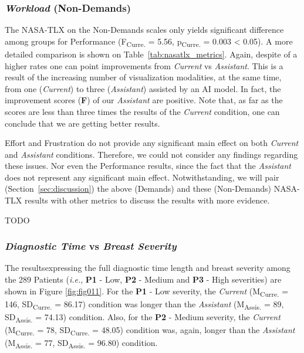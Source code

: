 \subsubsection{{\it Workload} (Non-Demands)}

The NASA-TLX on the Non-Demands scales only yields significant difference among groups for Performance (F\textsubscript{Curre.} = 5.56, p\textsubscript{Curre.} = 0.003 < 0.05).
A more detailed comparison is shown on Table~\ref{tab:nasatlx_metrics}.
Again, despite of a higher rates one can point improvements from {\it Current} vs {\it Assistant}.
This is a result of the increasing number of visualization modalities, at the same time, from one ({\it Current}) to three ({\it Assistant}) assisted by an AI model.
In fact, the improvement scores (\textbf{F}) of our {\it Assistant} are positive.
Note that, as far as the scores are less than three times the results of the {\it Current} condition, one can conclude that we are getting better results.

Effort and Frustration do not provide any significant main effect on both {\it Current} and {\it Assistant} conditions.
Therefore, we could not consider any findings regarding these issues.
Nor even the Performance results, since the fact that the {\it Assistant} does not represent any significant main effect.
Notwithstanding, we will pair (Section~\ref{sec:discussion}) the above (Demands) and these (Non-Demands) NASA-TLX results with other metrics to discuss the results with more evidence.

TODO



\subsubsection{{\it Diagnostic Time} vs {\it Breast Severity}}

The results\footnotemark[13] expressing the full diagnostic time length and breast severity among the 289 Patients ({\em i.e.}, {\bf P1} - Low, {\bf P2} - Medium and {\bf P3} - High severities) are shown in Figure \ref{fig:fig011}.
For the {\bf P1} - Low severity, the {\it Current} (M\textsubscript{Curre.} = 146, SD\textsubscript{Curre.} = 86.17) condition was longer than the {\it Assistant} (M\textsubscript{Assis.} = 89, SD\textsubscript{Assis.} = 74.13) condition.
Also, for the {\bf P2} - Medium severity, the {\it Current} (M\textsubscript{Curre.} = 78, SD\textsubscript{Curre.} = 48.05) condition was, again, longer than the {\it Assistant} (M\textsubscript{Assis.} = 77, SD\textsubscript{Assis.} = 96.80) condition.

